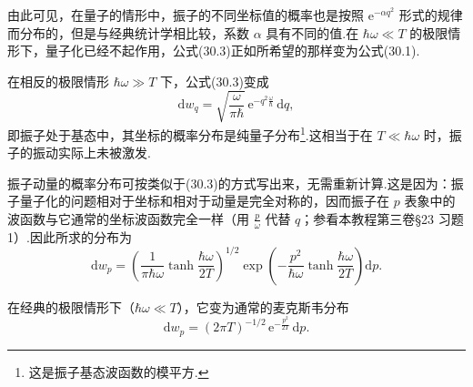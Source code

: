 由此可见，在量子的情形中，振子的不同坐标值的概率也是按照 $\mathrm{e}^{-\alpha q^2}$ 形式的规律而分布的，但是与经典统计学相比较，系数 $\alpha$ 具有不同的值.在 $\hbar\omega\ll T$ 的极限情形下，量子化已经不起作用，公式(30.3)正如所希望的那样变为公式(30.1).

在相反的极限情形 $\hbar\omega\gg T$ 下，公式(30.3)变成
\begin{equation*}
  \mathrm{d}w_q=\sqrt{\frac{\omega}{\pi\hbar}}\,\mathrm{e}^{-q^2\frac{\omega}{\hbar}}\,\mathrm{d}q,
\end{equation*}
即振子处于基态中，其坐标的概率分布是纯量子分布\footnote{这是振子基态波函数的模平方.}.这相当于在 $T\ll\hbar\omega$ 时，振子的振动实际上未被激发.

振子动量的概率分布可按类似于(30.3)的方式写出来，无需重新计算.这是因为：振子量子化的问题相对于坐标和相对于动量是完全对称的，因而振子在 $p$ 表象中的波函数与它通常的坐标波函数完全一样（用 $\frac{p}{\omega}$ 代替 $q$；参看本教程第三卷§23 习题1）.因此所求的分布为
\begin{equation}
  \mathrm{d}w_p=\left(\frac{1}{\pi\hbar\omega}\tanh\frac{\hbar\omega}{2T}\right)^{1/2}
  \exp\left(-\frac{p^2}{\hbar\omega}\tanh\frac{\hbar\omega}{2T}\right)\mathrm{d}p.
\end{equation}

在经典的极限情形下（$\hbar\omega\ll T$），它变为通常的麦克斯韦分布
\begin{equation}
  \mathrm{d}w_p=(2\pi T)^{-1/2}\,\mathrm{e}^{-\frac{p^2}{2T}}\,\mathrm{d}p.
\end{equation}

